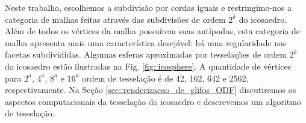 \documentclass[
    12pt,                %
    oneside,            %
    a4paper,            %
    english,            %
    french,                %
    spanish,            %
    brazil                %
    ]{abntex2}
\begin{document}


Neste trabalho, escolhemos a subdivisão por cordas iguais e restringimo-nos a categoria de malhas feitas através das subdivisões de ordem $2^k$ do icosaedro. Além de todos os vértices da malha possuírem suas antípodas, esta categoria de malha apresenta mais uma característica desejável: há uma regularidade nas facetas subdivididas. Algumas esferas aproximadas por tesselações de ordem $2^k$ do icosaedro estão ilustradas na Fig. \ref{fig::icosphere}. A quantidade de vértices para $2^a$, $4^a$, $8^a$ e $16^a$ ordem de tesselação é de 42, 162, 642 e 2562, respectivamente. Na Seção \ref{sec::renderizacao_de_glifos_ODF} discutiremos os aspectos computacionais da tesselação do icosaedro e descrevemos um algoritmo de tesselação.
\end{document}
